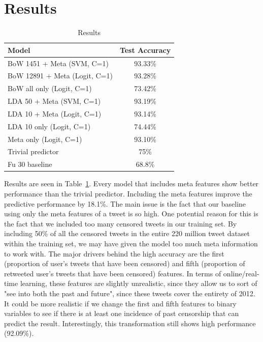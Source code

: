 \documentclass{sig-alternate-05-2015}
\begin{document}
\section{Results} \label{sec:res}
\begin{table}
  \centering
  \begin{tabular}{l|c}
    Model & Test Accuracy \\
    \hline 
    BoW 1451 + Meta (SVM, C=1) & 93.33\% \\
    BoW 12891 + Meta (Logit, C=1) & 93.28\% \\
    BoW all only (Logit, C=1) & 73.42\% \\
    LDA 50 + Meta (SVM, C=1) & 93.19\% \\
    LDA 10 + Meta (Logit, C=1) & 93.14\% \\
    LDA 10 only (Logit, C=1) & 74.44\% \\
    Meta only (Logit, C=1) & 93.10\% \\
    Trivial predictor & 75\% \\
    Fu 30 baseline & 68.8\%
  \end{tabular}
  \caption{Results}
  \label{tab:results}
\end{table}
Results are seen in Table~\ref{tab:results}. 
Every model that includes meta features show better performance than the trivial predictor. Including the meta features improve the predictive performance by 18.1\%. The main issue is the fact that our baseline using only the meta features of a tweet is so high. One potential reason for this is the fact that we included too many censored tweets in our training set. By including 50\% of all the censored tweets in the entire 220 million tweet dataset within the training set, we may have given the model too much meta information to work with. The major drivers behind the high accuracy are the first (proportion of user's tweets that have been censored) and fifth (proportion of retweeted user's tweets that have been censored) features. In terms of online/real-time learning, these features are slightly unrealistic, since they allow us to sort of "see into both the past and future", since these tweets cover the entirety of 2012. It could be more realistic if we change the first and fifth features to binary variables to see if there is at least one incidence of past censorship that can predict the result. Interestingly, this transformation still shows high performance (92.09\%). 
\end{document}
